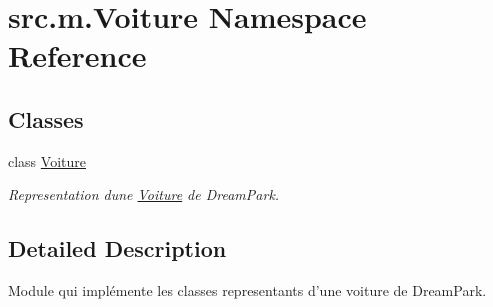 \hypertarget{namespacesrc_1_1m_1_1_voiture}{}\section{src.\+m.\+Voiture Namespace Reference}
\label{namespacesrc_1_1m_1_1_voiture}
\subsection*{Classes}
\begin{DoxyCompactItemize}
\item 
class \hyperlink{classsrc_1_1m_1_1_voiture_1_1_voiture}{Voiture}
\begin{DoxyCompactList}\small\item\em Representation d\textquotesingle{}une \hyperlink{classsrc_1_1m_1_1_voiture_1_1_voiture}{Voiture} de Dream\+Park. \end{DoxyCompactList}\end{DoxyCompactItemize}


\subsection{Detailed Description}
\begin{DoxyVerb}    Module qui implémente les classes representants d'une voiture de DreamPark.
\end{DoxyVerb}
 